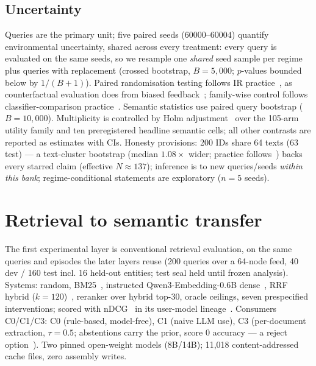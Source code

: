 \documentclass[a4paper,runningheads]{llncs}
\begin{document}
\subsection{Uncertainty}
\label{sec:uncertainty}

Queries are the primary unit; five paired seeds ($60000$--$60004$) quantify
environmental uncertainty, shared
across every treatment: every query is evaluated on the same seeds, so we
resample one \emph{shared} seed sample per regime plus queries with
replacement
(crossed bootstrap, $B=5{,}000$; $p$-values bounded below by $1/(B+1)$).
Paired randomisation testing
follows IR practice~\cite{smucker2007comparison}, as counterfactual
evaluation does from biased feedback~\cite{joachims2017unbiased};
family-wise control follows classifier-comparison
practice~\cite{demsar2006statistical}. Semantic statistics use paired
query bootstrap ($B=10{,}000$). Multiplicity is controlled by Holm
adjustment~\cite{holm1979simple} over the 105-arm utility family and ten preregistered
headline semantic cells; all other contrasts are reported as estimates
with CIs. Honesty provisions: 200 IDs share 64
texts (63 test) --- a text-cluster bootstrap (median $1.08\times$ wider;
practice follows~\cite{cameron2008bootstrap}) backs every starred claim
(effective $N\approx137$); inference is to new queries/seeds \emph{within
this bank}; regime-conditional statements are exploratory
($n=5$ seeds).

\section{Retrieval to semantic transfer}
\label{sec:transfer}

The first experimental layer is conventional retrieval evaluation, on the
same queries and episodes the later layers reuse (200 queries over
a 64-node feed, 40 dev / 160 test incl. 16 held-out entities;
test seal held until frozen analysis).
Systems: random, BM25~\cite{robertson1994okapi}, instructed
Qwen3-Embedding-0.6B dense~\cite{zhang2025qwen3embedding}, RRF hybrid
($k=120$)~\cite{cormack2009reciprocal}, reranker over
hybrid top-30, oracle ceilings, seven
prespecified interventions; scored with nDCG~\cite{jarvelin2002cumulated}
in its user-model lineage~\cite{moffat2008rbp}. Consumers C0/C1/C3: C0 (rule-based,
model-free), C1 (naive LLM use), C3 (per-document extraction,
$\tau=0.5$; abstentions carry the prior, score $0$ accuracy
--- a reject option~\cite{chow1970optimum}). Two pinned open-weight
models (8B/14B); 11{,}018 content-addressed cache files, zero assembly writes.
\end{document}

